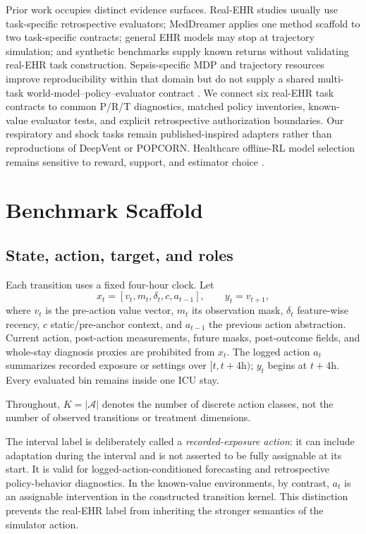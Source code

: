 \documentclass[sigconf,review]{acmart}
\begin{document}
Prior work occupies distinct evidence surfaces. Real-EHR studies usually use task-specific retrospective evaluators; MedDreamer applies one method scaffold to two task-specific contracts; general EHR models may stop at trajectory simulation; and synthetic benchmarks supply known returns without validating real-EHR task construction. Sepsis-specific MDP and trajectory resources improve reproducibility within that domain but do not supply a shared multi-task world-model--policy--evaluator contract \cite{choudhary2024icu,huang2025mimic}. We connect six real-EHR task contracts to common P/R/T diagnostics, matched policy inventories, known-value evaluator tests, and explicit retrospective authorization boundaries. Our respiratory and shock tasks remain published-inspired adapters rather than reproductions of DeepVent or POPCORN. Healthcare offline-RL model selection remains sensitive to reward, support, and estimator choice \cite{tang2021model,luo2024reinforcement}.

\section{Benchmark Scaffold}

\subsection{State, action, target, and roles}

Each transition uses a fixed four-hour clock. Let
\begin{equation}
x_t=[v_t,m_t,\delta_t,c,a_{t-1}],\qquad y_t=v_{t+1},
\end{equation}
where $v_t$ is the pre-action value vector, $m_t$ its observation mask, $\delta_t$ feature-wise recency, $c$ static/pre-anchor context, and $a_{t-1}$ the previous action abstraction. Current action, post-action measurements, future masks, post-outcome fields, and whole-stay diagnosis proxies are prohibited from $x_t$. The logged action $a_t$ summarizes recorded exposure or settings over $[t,t+4\mathrm{h})$; $y_t$ begins at $t+4\mathrm{h}$. Every evaluated bin remains inside one ICU stay.

Throughout, $K=|\mathcal A|$ denotes the number of discrete action classes, not the number of observed transitions or treatment dimensions.

The interval label is deliberately called a \emph{recorded-exposure action}: it can include adaptation during the interval and is not asserted to be fully assignable at its start. It is valid for logged-action-conditioned forecasting and retrospective policy-behavior diagnostics. In the known-value environments, by contrast, $a_t$ is an assignable intervention in the constructed transition kernel. This distinction prevents the real-EHR label from inheriting the stronger semantics of the simulator action.
\end{document}
